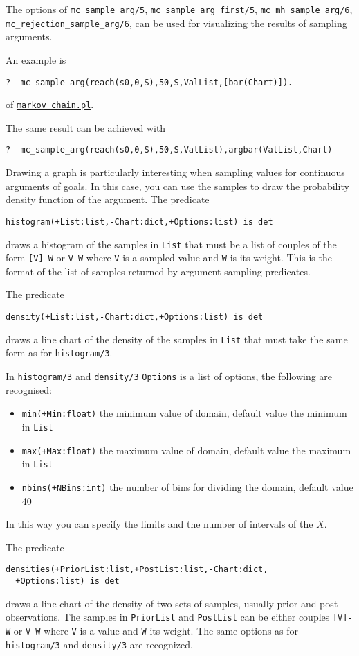 The options of
\verb|mc_sample_arg/5|, \verb|mc_sample_arg_first/5|,   \verb|mc_mh_sample_arg/6|,  \verb|mc_rejection_sample_arg/6|, 
can be used for visualizing the results of sampling arguments.

An example is
\begin{verbatim}
?- mc_sample_arg(reach(s0,0,S),50,S,ValList,[bar(Chart)]).
\end{verbatim}
of \href{http://cplint.eu/example/inference/markov_chain.pl}{\texttt{markov\_chain.pl}}.

The same result can be achieved with
\begin{verbatim}
?- mc_sample_arg(reach(s0,0,S),50,S,ValList),argbar(ValList,Chart)
\end{verbatim}
Drawing a graph is particularly interesting when
sampling values for continuous arguments of goals.
In this case, you can use the samples to draw the
probability density function of the argument.
The predicate
\begin{verbatim}
histogram(+List:list,-Chart:dict,+Options:list) is det
\end{verbatim}
draws a histogram of the samples in \verb|List| that  must be a list of couples of the form \verb|[V]-W| or  \verb|V-W|
where \verb|V| is a sampled value and \verb|W| is its weight. This is the format of the list of samples returned by argument sampling predicates.

The predicate
\begin{verbatim}
density(+List:list,-Chart:dict,+Options:list) is det
\end{verbatim}
draws a line chart of the density of  the samples in \verb|List| that  must take the same form as for \verb|histogram/3|.

In  \verb|histogram/3| and  \verb|density/3| \verb|Options| is a list of options, the following are recognised: \begin{itemize}
\item \verb|min(+Min:float)|
the minimum value of domain, default value the minimum in \verb|List|
\item \verb|max(+Max:float)|
the maximum value of domain, default value the maximum in  \verb|List|
\item \verb|nbins(+NBins:int)|
  the number of bins for dividing the domain, default value 40
\end{itemize}
In this way you can specify the limits and the number of intervals of the $X$.


The predicate
\begin{verbatim}
densities(+PriorList:list,+PostList:list,-Chart:dict,
  +Options:list) is det
\end{verbatim}
draws a line chart of the density of two sets of samples, usually
 prior and post observations. The samples in \verb|PriorList| and \verb|PostList|
can be either couples \verb|[V]-W| or \verb|V-W| where \verb|V| is a value and \verb|W| its weight.
The same options as for \verb|histogram/3| and  \verb|density/3|  are recognized.

